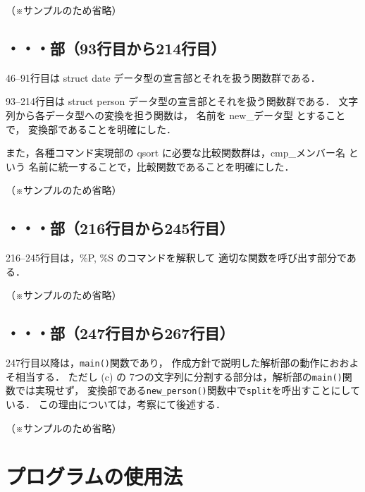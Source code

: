 \documentclass[a4j,11pt]{jarticle}
\begin{document}
（※サンプルのため省略）

\subsection{・・・部（93行目から214行目）}

46--91行目は struct date データ型の宣言部とそれを扱う関数群である．

93--214行目は struct person データ型の宣言部とそれを扱う関数群である．
文字列から各データ型への変換を担う関数は，
名前を new\_データ型 とすることで，
変換部であることを明確にした．

また，各種コマンド実現部の qsort に必要な比較関数群は，cmp\_メンバー名 という
名前に統一することで，比較関数であることを明確にした．

（※サンプルのため省略）

\subsection{・・・部（216行目から245行目）}

216--245行目は，\%P, \%S のコマンドを解釈して
適切な関数を呼び出す部分である．

（※サンプルのため省略）

\subsection{・・・部（247行目から267行目）}

247行目以降は，\verb|main()|関数であり，
作成方針で説明した解析部の動作におおよそ相当する．
ただし (c) の 7つの文字列に分割する部分は，解析部の\verb|main()|関数では実現せず，
変換部である\verb|new_person()|関数中で\verb|split|を呼出すことにしている．
この理由については，考察にて後述する．

（※サンプルのため省略）

\section{プログラムの使用法}
\end{document}
